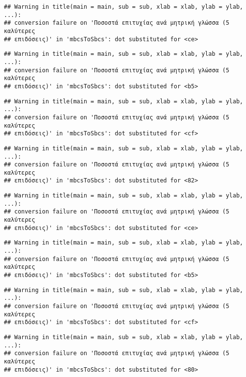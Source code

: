 \documentclass[
]{article}
\begin{document}
\begin{verbatim}
## Warning in title(main = main, sub = sub, xlab = xlab, ylab = ylab, ...):
## conversion failure on 'Ποσοστά επιτυχίας ανά μητρική γλώσσα (5 καλύτερες
## επιδόσεις)' in 'mbcsToSbcs': dot substituted for <ce>
\end{verbatim}

\begin{verbatim}
## Warning in title(main = main, sub = sub, xlab = xlab, ylab = ylab, ...):
## conversion failure on 'Ποσοστά επιτυχίας ανά μητρική γλώσσα (5 καλύτερες
## επιδόσεις)' in 'mbcsToSbcs': dot substituted for <b5>
\end{verbatim}

\begin{verbatim}
## Warning in title(main = main, sub = sub, xlab = xlab, ylab = ylab, ...):
## conversion failure on 'Ποσοστά επιτυχίας ανά μητρική γλώσσα (5 καλύτερες
## επιδόσεις)' in 'mbcsToSbcs': dot substituted for <cf>
\end{verbatim}

\begin{verbatim}
## Warning in title(main = main, sub = sub, xlab = xlab, ylab = ylab, ...):
## conversion failure on 'Ποσοστά επιτυχίας ανά μητρική γλώσσα (5 καλύτερες
## επιδόσεις)' in 'mbcsToSbcs': dot substituted for <82>
\end{verbatim}

\begin{verbatim}
## Warning in title(main = main, sub = sub, xlab = xlab, ylab = ylab, ...):
## conversion failure on 'Ποσοστά επιτυχίας ανά μητρική γλώσσα (5 καλύτερες
## επιδόσεις)' in 'mbcsToSbcs': dot substituted for <ce>
\end{verbatim}

\begin{verbatim}
## Warning in title(main = main, sub = sub, xlab = xlab, ylab = ylab, ...):
## conversion failure on 'Ποσοστά επιτυχίας ανά μητρική γλώσσα (5 καλύτερες
## επιδόσεις)' in 'mbcsToSbcs': dot substituted for <b5>
\end{verbatim}

\begin{verbatim}
## Warning in title(main = main, sub = sub, xlab = xlab, ylab = ylab, ...):
## conversion failure on 'Ποσοστά επιτυχίας ανά μητρική γλώσσα (5 καλύτερες
## επιδόσεις)' in 'mbcsToSbcs': dot substituted for <cf>
\end{verbatim}

\begin{verbatim}
## Warning in title(main = main, sub = sub, xlab = xlab, ylab = ylab, ...):
## conversion failure on 'Ποσοστά επιτυχίας ανά μητρική γλώσσα (5 καλύτερες
## επιδόσεις)' in 'mbcsToSbcs': dot substituted for <80>
\end{verbatim}
\end{document}
